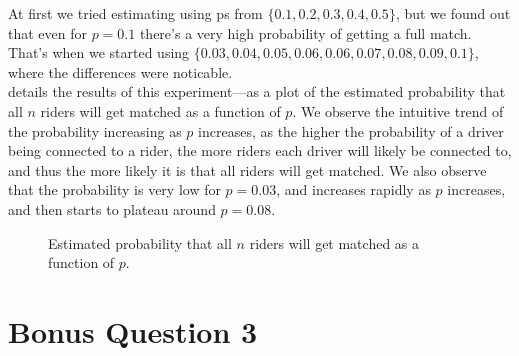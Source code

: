 \documentclass{article}
\begin{document}
\begin{enumerate}[label=(\alph*)]
    At first we tried estimating using ps from $\{0.1, 0.2, 0.3, 0.4, 0.5\}$, but we found out that even for $p=0.1$ there's a very high probability of getting a full match.\\
    That's when we started using $\{0.03, 0.04, 0.05, 0.06, 0.06, 0.07, 0.08, 0.09, 0.1\}$, where the differences were noticable.\\
    
     details the results of this experiment---as a plot of the estimated probability that all $n$ riders will get matched as a function of $p$. We observe the intuitive trend of the probability increasing as $p$ increases, as the higher the probability of a driver being connected to a rider, the more riders each driver will likely be connected to, and thus the more likely it is that all riders will get matched. We also observe that the probability is very low for $p = 0.03$, and increases rapidly as $p$ increases, and then starts to plateau around $p = 0.08$.
    
    \begin{figure*}[h]
        \centering
        \resizebox{0.6\textwidth}{!}{
            
        }
        \caption{Estimated probability that all $n$ riders will get matched as a function of $p$.}
        \label{fig:q10d}
    \end{figure*}

\end{enumerate}

\section{Bonus Question 3}
\end{document}
